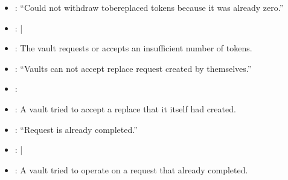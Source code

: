 \documentclass[a4paper,10pt,english]{sphinxmanual}
\begin{document}
\begin{itemize}
\item {} 
: “Could not withdraw to\sphinxhyphen{}be\sphinxhyphen{}replaced tokens because it was already zero.”

\item {} 
: {\hyperref[\detokenize{spec/replace:requestreplace}]{}} | {\hyperref[\detokenize{spec/replace:acceptreplace}]{}}

\item {} 
:  The vault requests or accepts an insufficient number of tokens.

\end{itemize}

\begin{itemize}
\item {} 
: “Vaults can not accept replace request created by themselves.”

\item {} 
: {\hyperref[\detokenize{spec/replace:acceptreplace}]{}}

\item {} 
:  A vault tried to accept a replace that it itself had created.

\end{itemize}

\begin{itemize}
\item {} 
: “Request is already completed.”

\item {} 
: {\hyperref[\detokenize{spec/replace:executereplace}]{}} | {\hyperref[\detokenize{spec/replace:cancelreplace}]{}}

\item {} 
:  A vault tried to operate on a request that already completed.

\end{itemize}
\end{document}

